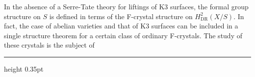 \documentclass[9pt]{article}
\newcommand{\CanonText}[1]{\par{\fontsize{8.0}{9.35}\selectfont\RaggedRight #1\par}\vspace{2.2pt}}
\begin{document}
\begin{minipage}[t][\dimexpr\textheight-5pt\relax][t]{\textwidth}
\CanonText{In the absence of a Serre-Tate theory for liftings of K3 surfaces, the formal group structure on \(S\) is defined in terms of the F-crystal structure on \(H^{2}_{\mathrm{DR}}(X/S)\). In fact, the case of abelian varieties and that of K3 surfaces can be included in a single structure theorem for a certain class of ordinary F-crystals. The study of these crystals is the subject of}
\vfill
{\color{Accent}\hrule height 0.35pt}\vspace{3pt}
\end{minipage}
\newpage
\end{document}

